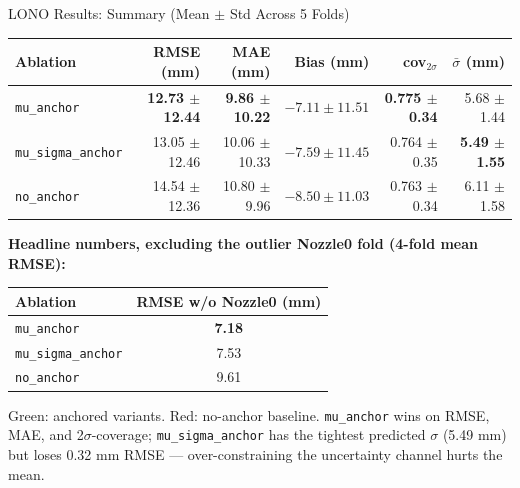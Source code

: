 \documentclass[UTF8,aspectratio=169]{ctexbeamer}
\newcommand{\good}[1]{\textcolor{green!45!black}{#1}}
\newcommand{\warn}[1]{\textcolor{red!65!black}{#1}}
\begin{document}
\begin{frame}{LONO Results: Summary (Mean $\pm$ Std Across 5 Folds)}
\small
\begin{center}
\renewcommand{\arraystretch}{1.22}
\setlength{\tabcolsep}{4pt}
\begin{tabular}{@{}lrrrrr@{}}
\toprule
\textbf{Ablation} & \textbf{RMSE (mm)} & \textbf{MAE (mm)} & \textbf{Bias (mm)} & \textbf{cov$_{2\sigma}$} & \textbf{$\bar\sigma$ (mm)} \\
\midrule
\rowcolor{winrow}
\texttt{mu\_anchor}        & \textbf{12.73 $\pm$ 12.44} & \textbf{9.86 $\pm$ 10.22} & $-7.11 \pm 11.51$ & \textbf{0.775 $\pm$ 0.34} & 5.68 $\pm$ 1.44 \\
\texttt{mu\_sigma\_anchor} & 13.05 $\pm$ 12.46 & 10.06 $\pm$ 10.33 & $-7.59 \pm 11.45$ & 0.764 $\pm$ 0.35 & \textbf{5.49 $\pm$ 1.55} \\
\rowcolor{warnrow}
\texttt{no\_anchor}        & 14.54 $\pm$ 12.36 & 10.80 $\pm$ 9.96 & $-8.50 \pm 11.03$ & 0.763 $\pm$ 0.34 & 6.11 $\pm$ 1.58 \\
\bottomrule
\end{tabular}
\end{center}

\vspace{0.5em}
\textbf{Headline numbers, excluding the outlier Nozzle0 fold (4-fold mean RMSE):}
\begin{center}
\renewcommand{\arraystretch}{1.2}
\begin{tabular}{@{}lc@{}}
\toprule
\textbf{Ablation} & \textbf{RMSE w/o Nozzle0 (mm)} \\
\midrule
\rowcolor{winrow}
\texttt{mu\_anchor}        & \textbf{7.18} \\
\texttt{mu\_sigma\_anchor} & 7.53 \\
\rowcolor{warnrow}
\texttt{no\_anchor}        & 9.61 \\
\bottomrule
\end{tabular}
\end{center}

\vspace{0.3em}
\footnotesize
\good{Green}: anchored variants. \warn{Red}: no-anchor baseline.
\texttt{mu\_anchor} wins on RMSE, MAE, and 2$\sigma$-coverage; \texttt{mu\_sigma\_anchor}
has the tightest predicted $\sigma$ (5.49 mm) but loses 0.32 mm RMSE — over-constraining the
uncertainty channel hurts the mean.
\end{frame}
\end{document}
